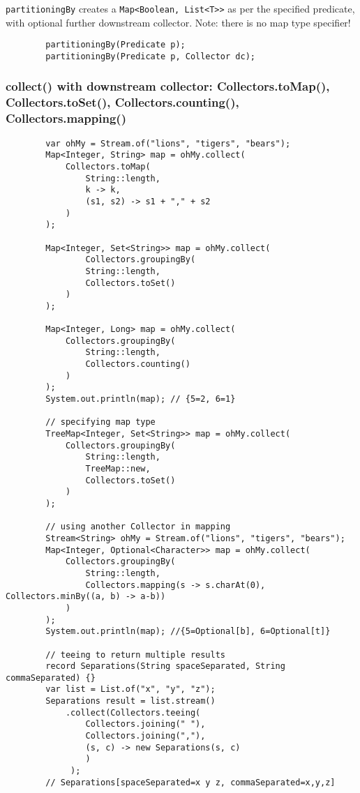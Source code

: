 \documentclass{scrartcl}
\begin{document}
    \lstinline{partitioningBy} creates a \lstinline{Map<Boolean, List<T>>} as per the specified predicate, with optional further downstream collector.
    Note: there is no map type specifier!

    \begin{lstlisting}
        partitioningBy(Predicate p);
        partitioningBy(Predicate p, Collector dc);
    \end{lstlisting}

\subsubsection{collect() with downstream collector: Collectors.toMap(), Collectors.toSet(), Collectors.counting(), Collectors.mapping()}

    \begin{lstlisting}
        var ohMy = Stream.of("lions", "tigers", "bears");
        Map<Integer, String> map = ohMy.collect(
            Collectors.toMap(
                String::length,
                k -> k,
                (s1, s2) -> s1 + "," + s2
            )
        );

        Map<Integer, Set<String>> map = ohMy.collect(
                Collectors.groupingBy(
                String::length,
                Collectors.toSet()
            )
        );

        Map<Integer, Long> map = ohMy.collect(
            Collectors.groupingBy(
                String::length,
                Collectors.counting()
            )
        );
        System.out.println(map); // {5=2, 6=1}

        // specifying map type
        TreeMap<Integer, Set<String>> map = ohMy.collect(
            Collectors.groupingBy(
                String::length,
                TreeMap::new,
                Collectors.toSet()
            )
        );

        // using another Collector in mapping
        Stream<String> ohMy = Stream.of("lions", "tigers", "bears");
        Map<Integer, Optional<Character>> map = ohMy.collect(
            Collectors.groupingBy(
                String::length,
                Collectors.mapping(s -> s.charAt(0), Collectors.minBy((a, b) -> a-b))
            )
        );
        System.out.println(map); //{5=Optional[b], 6=Optional[t]}

        // teeing to return multiple results
        record Separations(String spaceSeparated, String commaSeparated) {}
        var list = List.of("x", "y", "z");
        Separations result = list.stream()
            .collect(Collectors.teeing(
                Collectors.joining(" "),
                Collectors.joining(","),
                (s, c) -> new Separations(s, c)
                )
             );
        // Separations[spaceSeparated=x y z, commaSeparated=x,y,z]

    \end{lstlisting}
\end{document}
